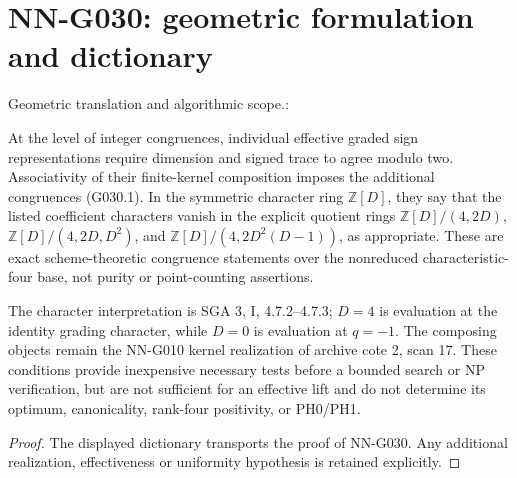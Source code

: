 \section{NN-G030: geometric formulation and dictionary}
\begin{geometricstatement}[NN-G030]
Geometric translation and algorithmic scope.:

At the level of integer congruences, individual effective
graded sign representations require dimension and signed
trace to agree modulo two.
Associativity of their finite-kernel composition imposes
the additional congruences (G030.1). In the symmetric
character ring $\mathbb Z[D]$, they say that the listed
coefficient characters vanish in the explicit quotient
rings $\mathbb Z[D]/(4,2D)$,
$\mathbb Z[D]/(4,2D,D^2)$, and
$\mathbb Z[D]/(4,2D^2(D-1))$, as appropriate.
These are exact scheme-theoretic congruence statements
over the nonreduced characteristic-four base, not
purity or point-counting assertions.

The character interpretation is SGA 3, I, 4.7.2--4.7.3;
$D=4$ is evaluation at the identity grading character,
while $D=0$ is evaluation at $q=-1$.
The composing objects remain the NN-G010 kernel
realization of archive cote 2, scan 17. These conditions
provide inexpensive necessary tests before a bounded
search or NP verification, but are not sufficient for
an effective lift and do not determine its optimum,
canonicality, rank-four positivity, or PH0/PH1.


\end{geometricstatement}
\begin{proof} The displayed dictionary transports the proof of NN-G030. Any additional realization, effectiveness or uniformity hypothesis is retained explicitly.\end{proof}


